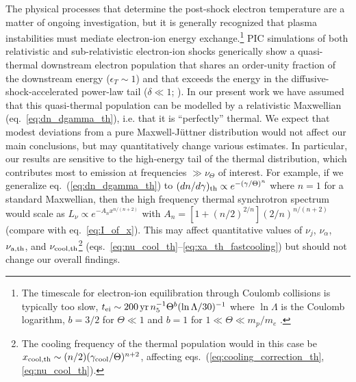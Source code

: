\documentclass[twocolumn]{aastex63}
\begin{document}
The physical processes that determine the post-shock electron temperature are a matter of ongoing investigation, but it is generally recognized that plasma instabilities must mediate electron-ion energy exchange.\footnote{
The timescale for electron-ion equilibration through Coulomb collisions is typically too slow, $t_{\rm ei} \sim 200\,{\rm yr}\, n_5^{-1} \Theta^b (\ln \Lambda / 30)^{-1}$ where $\ln \Lambda$ is the Coulomb logarithm, $b=3/2$ for $\Theta \ll 1$ \citep{Spitzer56} and $b=1$ for $1 \ll \Theta \ll m_p/m_e$ \citep{Stepney83}.
} 
PIC simulations of both relativistic and sub-relativistic electron-ion shocks generically show a quasi-thermal downstream electron population that 
shares an order-unity fraction of the downstream energy ($\epsilon_T \sim 1$) and that
exceeds the energy in
the diffusive-shock-accelerated power-law tail ($\delta \ll 1$; \citealt{Sironi&Spitkovsky11,Park+15,Crumley+19,Tran&Sironi20}).
In our present work we have assumed that this quasi-thermal population can be modelled by a relativistic Maxwellian (eq.~\ref{eq:dn_dgamma_th}), i.e. that it is ``perfectly'' thermal. We expect that modest deviations from a pure Maxwell-J\"{u}ttner distribution would not affect our main conclusions, but may quantitatively change various estimates. In particular, our results are sensitive to the high-energy tail of the thermal distribution, which contributes most to emission at frequencies $\gg \nu_\Theta$ of interest.
For example, if we generalize eq.~(\ref{eq:dn_dgamma_th}) to $(dn/d\gamma)_{\rm th} \propto e^{-(\gamma/\Theta)^n}$ where $n=1$ for a standard Maxwellian, then the high frequency thermal synchrotron spectrum would scale as 
$L_\nu \propto e^{ - A_n x^{{n}/{(n+2)}} }$ with $A_n = [ 1 + ({n}/{2})^{{2}/{n}} ] (2/n)^{{n}/{(n+2)}}$ (compare with eq.~\ref{eq:I_of_x}). 
This may affect quantitative values of $\nu_j$, $\nu_\alpha$, $\nu_{\rm a,th}$, and $\nu_{\rm cool,th}$\footnote{
The cooling frequency of the thermal population would in this case be $x_{\rm cool,th} \sim (n/2) (\gamma_{\rm cool}/\Theta)^{n+2}$, affecting eqs.~(\ref{eq:cooling_correction_th},\ref{eq:nu_cool_th}).}
(eqs.~\ref{eq:nu_cool_th}--\ref{eq:xa_th_fastcooling})
but should not change our overall findings.
\end{document}

